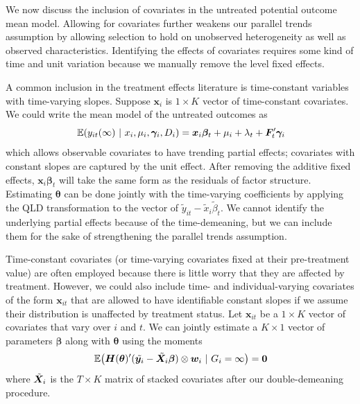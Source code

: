 \documentclass[12pt]{article}
\begin{document}

We now discuss the inclusion of covariates in the untreated potential outcome mean model. Allowing for covariates further weakens our parallel trends assumption by allowing selection to hold on unobserved heterogeneity as well as observed characteristics. Identifying the effects of covariates requires some kind of time and unit variation because we manually remove the level fixed effects. 

A common inclusion in the treatment effects literature is time-constant variables with time-varying slopes. Suppose $\bm x_i$ is $1 \times K$ vector of time-constant covariates. We could write the mean model of the untreated outcomes as 
\begin{equation}
    \expec{y_{it}(\infty)}{x_i, \mu_i, \bm \gamma_i, D_i} = \bm x_i \bm \beta_t + \mu_i + \lambda_t + \bm{F}_t' \bm \gamma_i
\end{equation}
which allows observable covariates to have trending partial effects; covariates with constant slopes are captured by the unit effect. After removing the additive fixed effects, $\bm x_i \bm \beta_t$ will take the same form as the residuals of factor structure. Estimating $\bm{\theta}$ can be done jointly with the time-varying coefficients by applying the QLD transformation to the vector of $\tilde{y}_{it} - \tilde{x}_i \tilde{\beta}_t$. We cannot identify the underlying partial effects because of the time-demeaning, but we can include them for the sake of strengthening the parallel trends assumption.

Time-constant covariates (or time-varying covariates fixed at their pre-treatment value) are often employed because there is little worry that they are affected by treatment. However, we could also include time- and individual-varying covariates of the form $\bm x_{it}$ that are allowed to have identifiable constant slopes if we assume their distribution is unaffected by treatment status. Let $\bm x_{it}$ be a $1 \times K$ vector of covariates that vary over $i$ and $t$. We can jointly estimate a $K \times 1$ vector of parameters $\bm \beta$ along with $\bm{\theta}$ using the moments
\begin{equation}
    \expec{\bm H(\bm{\theta})' (\tilde{\bm y_i} - \tilde{\bm X_i} \bm \beta) \otimes \bm w_i}{G_i = \infty} = \bm 0
\end{equation}
where $\Tilde{\bm X}_i$ is the $T \times K$ matrix of stacked covariates after our double-demeaning procedure.
\end{document}
